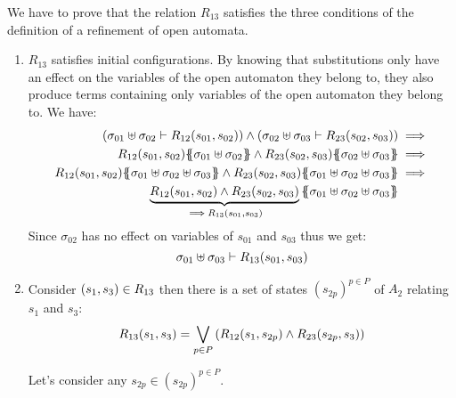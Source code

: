 \documentclass[runningheads]{llncs}
\begin{document}
We have to prove that the relation $R_{13}$ satisfies the three conditions of the definition of a refinement of open automata.
\begin{enumerate}
\item $R_{13}$ satisfies initial configurations. By knowing that substitutions only have an effect on the variables of the open automaton they belong to, they also produce terms containing only variables of the open automaton they belong to. We have:
\begin{align*}
\mpar{\sigma_{01} \uplus \sigma_{02} \vdash R_{12}\mpar{s_{01}, s_{02}}} \wedge \mpar
{\sigma_{02} \uplus \sigma_{03} \vdash R_{23}\mpar{s_{02}, s_{03}}}&\implies\\
R_{12}\mpar{s_{01},s_{02}}\psubst{\sigma_{01} \uplus \sigma_{02}} \wedge R_{23}\mpar{s_{02}, s_{03}}\psubst{\sigma_{02} \uplus \sigma_{03}}&\implies\\
R_{12}\mpar{s_{01},s_{02}}\psubst{\sigma_{01} \uplus \sigma_{02} \uplus \sigma_{03}} \wedge R_{23}\mpar{s_{02}, s_{03}}\psubst{\sigma_{01} \uplus \sigma_{02} \uplus \sigma_{03}}&\implies\\ 
\underbrace{R_{12}\mpar{s_{01},s_{02}}\wedge R_{23}\mpar{s_{02}, s_{03}}}_{\implies R_{13} \mpar{s_{01}, s_{03}}}\psubst{\sigma_{01} \uplus \sigma_{02} \uplus \sigma_{03}} %
 \end{align*}
Since $\sigma_{02}$ has no effect on variables of $s_{01}$ and $s_{03}$ thus we get:
\[\sigma_{01} \uplus \sigma_{03} \vdash R_{13} {\left(s_{01}, s_{03}\right)}\]
\item Consider ${\left(s_{1}, s_{3}\right)} \in R_{13}$ then there is a set of states $(s_{2p})^{p\in P}$ of $A_2$ relating  $s_{1}$ and $s_{3}$:
\[R_{13}(s_1,s_3)=\bigvee_{{p\in P}
}{\left(R_{12}{\left(s_1,s_{2p}\right)} \wedge R_{23}{\left(s_{2p},s_3\right)}\right)} \]

Let's consider any $s_{2p} \in (s_{2p})^{p\in P}$.


\end{enumerate}
\end{document}
